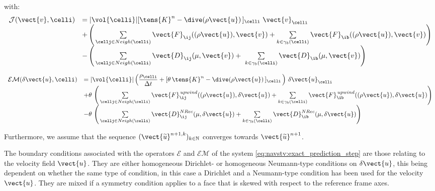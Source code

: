 with:
\begin{equation*}
\begin{array}{ll}
\mathcal{J}(\vect{v},\celli) & = |{\vol{\celli}}|  [\tens{K}^{n}-\dive(\rho \vect{u})\,]_{\celli}\,\,\vect{v}_{\celli} \\
& + \left(\,\sum\limits_{\cellj \in Neigh(\celli)}{\vect{F}_{\ij}((\rho\vect{u}),\vect{v})}
+ \sum\limits_{k\in {\gamma_b(\celli)}} {\vect{F}_{\ib}((\rho \vect{u}),\vect{v})}\right)\\
&-\left(\,\sum\limits_{\cellj\in Neigh(\celli)}{\vect{D}_{\ij}(\mu,\vect{v})}
+\,\,\sum\limits_{k\in {\gamma_b(\celli)}} {\vect{D}_{\ib}(\mu,\vect{v})}\right)\\
\end{array}
\end{equation*}

\begin{equation*}
\begin{array}{ll}
\mathcal{EM}(\delta\vect{u}, \celli) & =
|{\vol{\celli}}| \left( \displaystyle\frac{\rho_\celli}{\Delta t} +[\theta\,\tens{K}^{n}-\dive(\rho \vect{u})\,]_{\celli}\,\right)\,\delta\vect{u}_{\celli}\\
&+\theta\,\left(\,\sum\limits_{\cellj \in Neigh(\celli)}{\vect{F}^{\,upwind}_{\ij}((\rho\vect{u}),\delta\vect{u})}
+ \sum\limits_{k\in {\gamma_b(\celli)}} {\vect{F}^{\,upwind}_{\ib}((\rho \vect{u}),\delta\vect{u})}\right)\\
&-\theta\,\left(\,\sum\limits_{\cellj \in Neigh(\celli)}{\vect{D}^{NRec}_{\ij}(\mu,\delta\vect{u})}
+ \sum\limits_{k\in {\gamma_b(\celli)}} {\vect{D}^{NRec}_{\ib}(\mu,\delta\vect{u})}\right)\\
\end{array}
\end{equation*}


Furthermore, we assume that the sequence  $(\vect{\widetilde{u}}^{n+1,k})_{k\in \mathbb{N}}$
converges %
towards $\vect{\widetilde{u}}^{n+1}$.\\

\begin{remark}
The boundary conditions associated with the operators $\mathcal{E}$ and
$\mathcal{EM}$ of the system \eqref{eq:navstv:exact_prediction_step} are those relating to the velocity field $\vect{u}$. They are either homogeneous Dirichlet- or homogeneous Neumann-type conditions on $\delta\vect{u}$, this being dependent on whether the same type of condition, in this case a Dirichlet and a Neumann-type condition has been used for the velocity $\vect{u}$. They are mixed if a symmetry condition applies to a face that is skewed with respect to the reference frame axes.
\end{remark}


